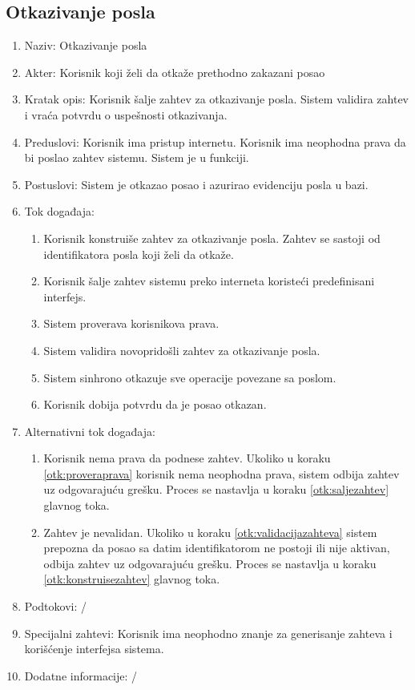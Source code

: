 \documentclass[12pt,oneside]{memoir}
\begin{document}
\subsection{Otkazivanje posla}
\begin{enumerate}
\item Naziv: Otkazivanje posla
\item Akter: Korisnik koji želi da otkaže prethodno zakazani posao
\item Kratak opis: Korisnik šalje zahtev za otkazivanje posla. Sistem validira zahtev i vraća potvrdu o uspešnosti otkazivanja.
\item Preduslovi: Korisnik ima pristup internetu. Korisnik ima neophodna prava da bi poslao zahtev sistemu. Sistem je u funkciji.
\item Postuslovi: Sistem je otkazao posao i azurirao evidenciju posla u bazi.
\item Tok događaja:
	\begin{enumerate}
	\item \label{otk:konstruisezahtev} Korisnik konstruiše zahtev za otkazivanje posla. Zahtev se sastoji od identifikatora posla koji želi da otkaže.
	\item \label{otk:saljezahtev} Korisnik šalje zahtev sistemu preko interneta koristeći predefinisani interfejs.
	\item \label{otk:proveraprava} Sistem proverava korisnikova prava.
	\item \label{otk:validacijazahteva} Sistem validira novopridošli zahtev za otkazivanje posla.
	\item \label{otk:sinhotkazivanje} Sistem sinhrono otkazuje sve operacije povezane sa poslom.
	\item Korisnik dobija potvrdu da je posao otkazan.
	\end{enumerate}
\item Alternativni tok događaja:
	\begin{enumerate}
	\item Korisnik nema prava da podnese zahtev. Ukoliko u koraku \ref{otk:proveraprava} korisnik nema neophodna prava, sistem odbija zahtev uz odgovarajuću grešku. Proces se nastavlja u koraku \ref{otk:saljezahtev} glavnog toka.
	\item Zahtev je nevalidan. Ukoliko u koraku \ref{otk:validacijazahteva} sistem prepozna da posao sa datim identifikatorom ne postoji ili nije aktivan, odbija zahtev uz odgovarajuću grešku. Proces se nastavlja u koraku \ref{otk:konstruisezahtev} glavnog toka.
	\end{enumerate}
\item Podtokovi: /
\item Specijalni zahtevi: Korisnik ima neophodno znanje za generisanje zahteva i korišćenje interfejsa sistema.
\item Dodatne informacije: /
\end{enumerate}
\end{document}
